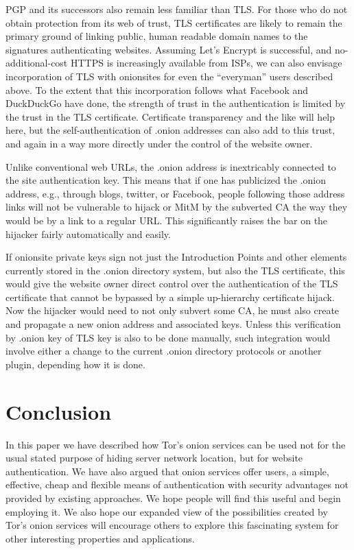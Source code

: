 \documentclass[10pt, conference, compsocconf]{styles/IEEEtran}
\begin{document}
PGP and its successors also remain less familiar than TLS. For those
who do not obtain protection from its web of trust, TLS certificates
are likely to remain the primary ground of linking public, human
readable domain names to the signatures authenticating
websites. Assuming Let's Encrypt is successful, and no-additional-cost
HTTPS is increasingly available from ISPs, we can also
envisage incorporation of TLS with onionsites for even the
``everyman'' users described above.  To the extent that this
incorporation follows what Facebook and DuckDuckGo have done, the
strength of trust in the authentication is limited by the trust in the
TLS certificate. Certificate transparency and the
like will help here, but the self-authentication of .onion addresses
can also add to this trust, and again in a way more directly under the
control of the website owner.

Unlike conventional web URLs, the .onion address is inextricably connected to
the site authentication key. This means that if one has publicized the
.onion address, e.g., through blogs, twitter, or Facebook, people
following those address links will not be vulnerable to hijack or MitM
by the subverted CA the way they would be by a link to a regular
URL\@. This significantly raises the bar on the hijacker fairly
automatically and easily.

If onionsite private keys sign not just the Introduction Points and
other elements currently stored in the .onion directory system, but
also the TLS certificate, this would give the website owner direct
control over the authentication of the TLS certificate that cannot be
bypassed by a simple up-hierarchy certificate hijack. Now the hijacker
would need to not only subvert some CA, he must also create and
propagate a new onion address and associated keys. Unless this
verification by .onion key of TLS key is also to be done manually,
such integration would involve either a change to the current .onion directory
protocols or another plugin, depending how it is done.

\section{Conclusion}

In this paper we have described how Tor's onion services can be used
not for the usual stated purpose of hiding server network location,
but for website authentication.  We have also argued that onion
services offer users, a simple, effective, cheap and flexible means of
authentication with security advantages not provided by existing
approaches. We hope people will find this useful and begin employing
it. We also hope our expanded view of the possibilities created by
Tor's onion services will encourage others to explore this
fascinating system for other interesting properties and applications.
\end{document}
